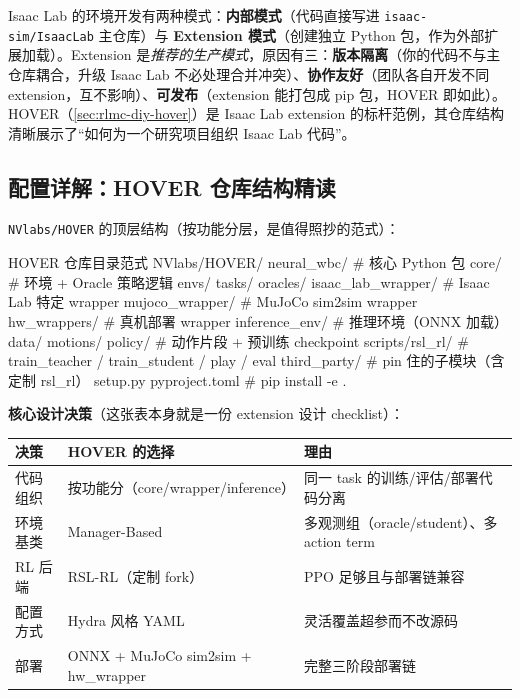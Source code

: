 Isaac Lab 的环境开发有两种模式：\textbf{内部模式}（代码直接写进 \verb|isaac-sim/IsaacLab| 主仓库）与 \textbf{Extension 模式}（创建独立 Python 包，作为外部扩展加载）。Extension 是\emph{推荐的生产模式}，原因有三：\textbf{版本隔离}（你的代码不与主仓库耦合，升级 Isaac Lab 不必处理合并冲突）、\textbf{协作友好}（团队各自开发不同 extension，互不影响）、\textbf{可发布}（extension 能打包成 pip 包，HOVER 即如此）。HOVER（\cref{sec:rlmc-diy-hover}）是 Isaac Lab extension 的标杆范例，其仓库结构清晰展示了“如何为一个研究项目组织 Isaac Lab 代码”。

\subsection{配置详解：HOVER 仓库结构精读}
\label{sec:rlmc-diy-isaac-hover-layout}

\verb|NVlabs/HOVER| 的顶层结构（按功能分层，是值得照抄的范式）：

\begin{codebox}[text]{HOVER 仓库目录范式}
NVlabs/HOVER/
  neural_wbc/                 # 核心 Python 包
    core/                     # 环境 + Oracle 策略逻辑
      envs/   tasks/  oracles/
    isaac_lab_wrapper/        # Isaac Lab 特定 wrapper
    mujoco_wrapper/           # MuJoCo sim2sim wrapper
    hw_wrappers/              # 真机部署 wrapper
    inference_env/            # 推理环境（ONNX 加载）
    data/   motions/  policy/ # 动作片段 + 预训练 checkpoint
  scripts/rsl_rl/             # train_teacher / train_student / play / eval
  third_party/                # pin 住的子模块（含定制 rsl_rl）
  setup.py   pyproject.toml   # pip install -e .
\end{codebox}

\textbf{核心设计决策}（这张表本身就是一份 extension 设计 checklist）：

\begin{center}
\small
\begin{tabular}{@{}lp{4.6cm}p{5.4cm}@{}}
\toprule
决策 & HOVER 的选择 & 理由 \\
\midrule
代码组织 & 按功能分（core/wrapper/inference） & 同一 task 的训练/评估/部署代码分离 \\
环境基类 & Manager-Based & 多观测组（oracle/student）、多 action term \\
RL 后端 & RSL-RL（定制 fork） & PPO 足够且与部署链兼容 \\
配置方式 & Hydra 风格 YAML & 灵活覆盖超参而不改源码 \\
部署 & ONNX + MuJoCo sim2sim + hw\_wrapper & 完整三阶段部署链 \\
\bottomrule
\end{tabular}
\end{center}

